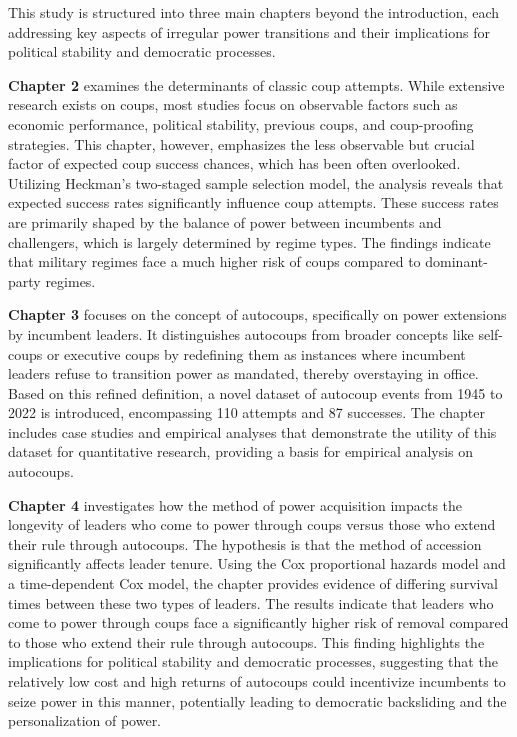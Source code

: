 \documentclass[
  12pt,
]{report}
\begin{document}
This study is structured into three main chapters beyond the
introduction, each addressing key aspects of irregular power transitions
and their implications for political stability and democratic processes.

\textbf{Chapter 2} examines the determinants of classic coup attempts.
While extensive research exists on coups, most studies focus on
observable factors such as economic performance, political stability,
previous coups, and coup-proofing strategies. This chapter, however,
emphasizes the less observable but crucial factor of expected coup
success chances, which has been often overlooked. Utilizing Heckman's
two-staged sample selection model, the analysis reveals that expected
success rates significantly influence coup attempts. These success rates
are primarily shaped by the balance of power between incumbents and
challengers, which is largely determined by regime types. The findings
indicate that military regimes face a much higher risk of coups compared
to dominant-party regimes.

\textbf{Chapter 3} focuses on the concept of autocoups, specifically on
power extensions by incumbent leaders. It distinguishes autocoups from
broader concepts like self-coups or executive coups by redefining them
as instances where incumbent leaders refuse to transition power as
mandated, thereby overstaying in office. Based on this refined
definition, a novel dataset of autocoup events from 1945 to 2022 is
introduced, encompassing 110 attempts and 87 successes. The chapter
includes case studies and empirical analyses that demonstrate the
utility of this dataset for quantitative research, providing a basis for
empirical analysis on autocoups.

\textbf{Chapter 4} investigates how the method of power acquisition
impacts the longevity of leaders who come to power through coups versus
those who extend their rule through autocoups. The hypothesis is that
the method of accession significantly affects leader tenure. Using the
Cox proportional hazards model and a time-dependent Cox model, the
chapter provides evidence of differing survival times between these two
types of leaders. The results indicate that leaders who come to power
through coups face a significantly higher risk of removal compared to
those who extend their rule through autocoups. This finding highlights
the implications for political stability and democratic processes,
suggesting that the relatively low cost and high returns of autocoups
could incentivize incumbents to seize power in this manner, potentially
leading to democratic backsliding and the personalization of power.
\end{document}
